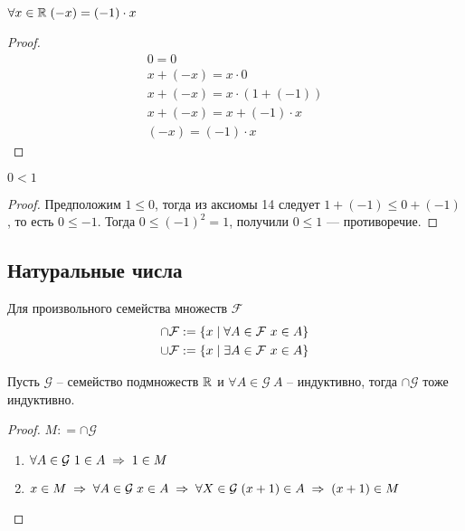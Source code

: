     \begin{theorem}
        $\forall x \in \mathbb{R} \; (-x) = (-1) \cdot x$
    \end{theorem} \begin{proof}
        \begin{gather*}
            0 = 0 \\
        x + (-x) = x \cdot 0 \\
        x + (-x) = x \cdot (1 + (-1)) \\
        x + (-x) = x + (-1) \cdot x \\
        (-x) = (-1) \cdot x
        \end{gather*}
    \end{proof}
    \begin{theorem}
        $ 0 < 1 $
    \end{theorem} \begin{proof}
        Предположим $ 1 \leq 0 $, тогда из аксиомы 14 следует $ 1 + (-1) \leq 0 + (-1) $, то есть $ 0 \leq - 1 $.
        Тогда $ 0 \leq ( - 1)^2 = 1 $, получили $ 0 \leq  1 $ --- противоречие.
    \end{proof}



\subsection{Натуральные числа}

Для произвольного семейства множеств $\mathcal{F}$
\begin{gather}
    \cap \mathcal{F} : = \{x \;\vert\; \forall A \in \mathcal{F}\ x \in A\} \\
    \cup \mathcal{F} : = \{x \;\vert\; \exists A \in \mathcal{F}\ x \in A\}
\end{gather}


 \begin{theorem}
     \label{definition_inductive}
    Пусть $ \mathcal{G} $ -- семейство подмножеств $ \mathbb{R} $ и $ \forall A \in \mathcal{G} \ A $ -- индуктивно, тогда
    $ \cap \mathcal{G} $ тоже индуктивно.
 \end{theorem}
 \begin{proof} $ M : = \cap \mathcal{G}$
    \begin{enumerate}
        \item $ \forall A \in  \mathcal{G} \ 1 \in A \thus 1 \in M $
        \item $x \in M \thus \forall A \in \mathcal{G} \; x \in A \thus \forall X \in \mathcal{G} \; (x + 1) \in A \thus (x + 1) \in M$
    \end{enumerate}
 \end{proof}

